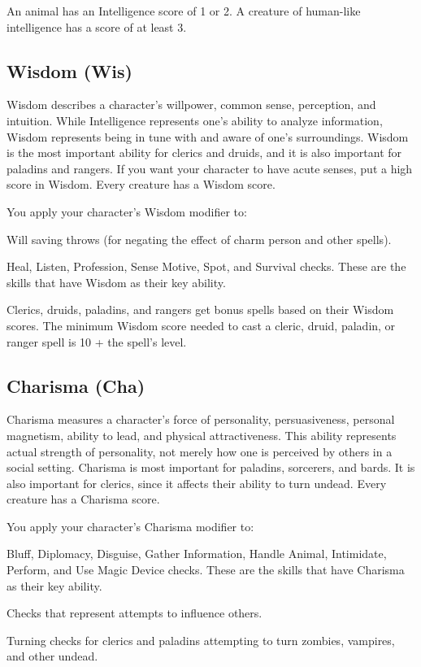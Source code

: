 An animal has an Intelligence score of 1 or 2. A creature of human-like intelligence has a score of at least 3.

\subsection{Wisdom (Wis)}
Wisdom describes a character's willpower, common sense, perception, and intuition. While Intelligence represents one's ability to analyze information, Wisdom represents being in tune with and aware of one's surroundings. Wisdom is the most important ability for clerics and druids, and it is also important for paladins and rangers. If you want your character to have acute senses, put a high score in Wisdom. Every creature has a Wisdom score.

You apply your character's Wisdom modifier to:
\begin{itemize*}
\item Will saving throws (for negating the effect of charm person and other spells).
\item Heal, Listen, Profession, Sense Motive, Spot, and Survival checks. These are the skills that have Wisdom as their key ability.
\item Clerics, druids, paladins, and rangers get bonus spells based on their Wisdom scores. The minimum Wisdom score needed to cast a cleric, druid, paladin, or ranger spell is 10 + the spell's level.
\end{itemize*}

\subsection{Charisma (Cha)}
Charisma measures a character's force of personality, persuasiveness, personal magnetism, ability to lead, and physical attractiveness. This ability represents actual strength of personality, not merely how one is perceived by others in a social setting. Charisma is most important for paladins, sorcerers, and bards. It is also important for clerics, since it affects their ability to turn undead. Every creature has a Charisma score.

You apply your character's Charisma modifier to:
\begin{itemize*}
\item Bluff, Diplomacy, Disguise, Gather Information, Handle Animal, Intimidate, Perform, and Use Magic Device checks. These are the skills that have Charisma as their key ability.
\item Checks that represent attempts to influence others.
\item Turning checks for clerics and paladins attempting to turn zombies, vampires, and other undead.
\end{itemize*}


